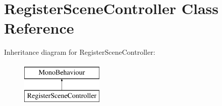 \hypertarget{classRegisterSceneController}{}\section{Register\+Scene\+Controller Class Reference}
\label{classRegisterSceneController}
Inheritance diagram for Register\+Scene\+Controller\+:\begin{figure}[H]
\begin{center}
\leavevmode
\includegraphics[height=2.000000cm]{classRegisterSceneController}
\end{center}
\end{figure}
